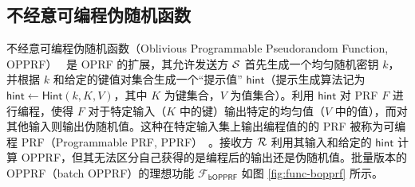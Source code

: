 \subsection{不经意可编程伪随机函数}\label{sec:bopprf}

不经意可编程伪随机函数（Oblivious Programmable Pseudorandom Function, OPPRF）~\cite{KMPRT-CCS-2017,PSTY-EUROCRYPT-2019,CGS22,RS-EUROCRYPT-2021,RR-CCS-2022} 是 OPRF 的扩展，其允许发送方 $\mathcal{S}$ 首先生成一个均匀随机密钥 $k$，并根据 $k$ 和给定的键值对集合生成一个“提示值” $\mathsf{hint}$（提示生成算法记为 $\mathsf{hint} \gets \mathsf{Hint}(k, K, V)$，其中 $K$ 为键集合，$V$ 为值集合）。利用 $\mathsf{hint}$ 对 PRF $F$ 进行编程，使得 $F$ 对于特定输入（$K$ 中的键）输出特定的均匀值（$V$ 中的值），而对其他输入则输出伪随机值。这种在特定输入集上输出编程值的的 PRF 被称为可编程 PRF（Programmable PRF, PPRF）~\cite{PSTY-EUROCRYPT-2019}。接收方 $\mathcal{R}$ 利用其输入和给定的 $\mathsf{hint}$ 计算 OPPRF，但其无法区分自己获得的是编程后的输出还是伪随机值。批量版本的 OPPRF（batch OPPRF）的理想功能 $\mathcal{F}_{\mathsf{bOPPRF}}$ 如图 \ref{fig:func-bopprf} 所示。

